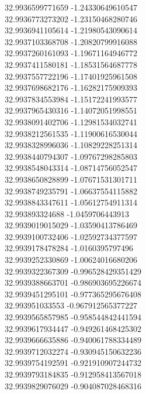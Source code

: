 {32.9936599771659	-1.24330649610547\\
32.9936773273202	-1.23150468280746\\
32.9936941105614	-1.21980543090614\\
32.9937103368708	-1.20820799916088\\
32.9937260161093	-1.19671164946772\\
32.9937411580181	-1.18531564687778\\
32.9937557722196	-1.17401925961508\\
32.9937698682176	-1.16282175909393\\
32.9937834553984	-1.15172241993577\\
32.9937965430316	-1.14072051998551\\
32.9938091402706	-1.12981534032741\\
32.9938212561535	-1.11900616530044\\
32.9938328996036	-1.10829228251314\\
32.9938440794307	-1.09767298285803\\
32.9938548043314	-1.08714756052547\\
32.9938650828899	-1.07671531301711\\
32.9938749235791	-1.06637554115882\\
32.9938843347611	-1.05612754911314\\
32.993893324688	-1.0459706443913\\
32.9939019015029	-1.03590413786469\\
32.9939100732406	-1.02592734377597\\
32.9939178478284	-1.0160395797496\\
32.9939252330869	-1.00624016680206\\
32.9939322367309	-0.996528429351429\\
32.9939388663701	-0.986903695226674\\
32.9939451295101	-0.977365295676408\\
32.993951033553	-0.967912565377227\\
32.9939565857985	-0.958544842441594\\
32.9939617934447	-0.949261468425302\\
32.9939666635886	-0.940061788334489\\
32.9939712032274	-0.930945150632236\\
32.9939754192591	-0.921910907244732\\
32.9939793184835	-0.912958413567018\\
32.9939829076029	-0.904087028468316\\
}
